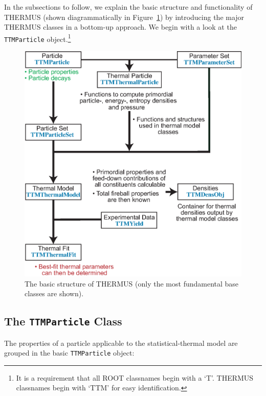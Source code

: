 \documentclass{elsarticle}
\begin{document}
In the subsections to follow, we explain the basic structure and functionality of THERMUS (shown diagrammatically in Figure~\ref{FlowChart}) by introducing 
the major THERMUS classes in a bottom-up approach. We begin with a look at the \texttt{TTMParticle} object.\footnote{It is a requirement that all ROOT 
classnames begin with a `T'. THERMUS classnames begin with `TTM' for easy identification.}\\ 

\begin{figure}
\begin{center}
\includegraphics[width=12cm]{fig2_Thermus_Structure_v4.eps}
\caption{The basic structure of THERMUS (only the most fundamental base classes are shown).}\label{FlowChart}
\end{center}
\end{figure}

\pagebreak

\subsection{The \texttt{TTMParticle} Class} 

The properties of a particle applicable to the statistical-thermal model are grouped 
in the basic \texttt{TTMParticle} object:
\end{document}
